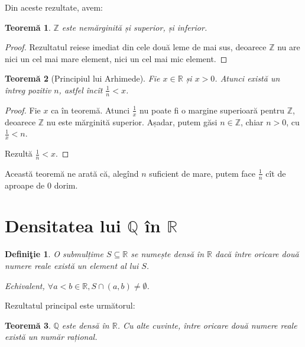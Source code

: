 \documentclass[11pt,a4paper]{article}
\newcommand\seq{\subseteq}
\newcommand\RR{\mathbb{R}}
\newcommand\ZZ{\mathbb{Z}}
\newcommand\QQ{\mathbb{Q}}
\theoremstyle{dotless}
\newtheorem{theorem}{Teorem\u{a}}[section]
\theoremstyle{dotlessdr}
\newtheorem{definition}{Defini\c{t}ie}[section]
\begin{document}
Din aceste rezultate, avem:

\begin{theorem}\label{thm:z-nemarg}
  $\ZZ$ este nemărginită și superior, și inferior.
\end{theorem}

\begin{proof}
  Rezultatul reiese imediat din cele două leme de mai sus, deoarece $\ZZ$ nu are
  nici un cel mai mare element, nici un cel mai mic element.
\end{proof}

\begin{theorem}[Principiul lui Arhimede]\label{thm:arhimede}
  Fie $x \in \RR$ și $x > 0$. Atunci există un întreg pozitiv $n$, astfel încît $\frac{1}{n} < x$.
\end{theorem}

\begin{proof}
  Fie $x$ ca în teoremă. Atunci $\frac{1}{x}$ nu poate fi o margine superioară pentru $\ZZ$, deoarece
  $\ZZ$ nu este mărginită superior. Așadar, putem găsi $n \in \ZZ$, chiar $n > 0$, cu $\frac{1}{x} < n$.

  Rezultă $\frac{1}{n} < x$.
\end{proof}

Această teoremă ne arată că, alegînd $n$ suficient de mare, putem face $\frac{1}{n}$
cît de aproape de 0 dorim.


\section{Densitatea lui $\QQ$ în $\RR$}
\label{sec:densitate}

\begin{definition}\label{def:densitate}
  O submulțime $S \seq \RR$ se numește \emph{densă în $\RR$} dacă între oricare
  două numere reale există un element al lui $S$.

  Echivalent, $\forall a < b \in \RR, S \cap (a, b) \neq \emptyset$.
\end{definition}

Rezultatul principal este următorul:

\begin{theorem}\label{thm:q-densa}
  $\QQ$ este densă în $\RR$. Cu alte cuvinte, între oricare două numere reale
  există un număr rațional.
\end{theorem}
\end{document}
